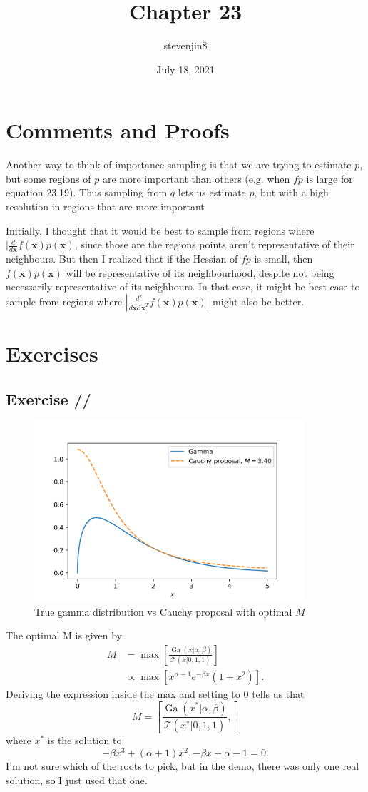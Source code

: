 \documentclass[a4paper,11pt]{article}
\title{Chapter 23}
\author{stevenjin8}
\date{July 18, 2021}
\DeclareMathOperator*{\Ga}{Ga}
\newcounter{exercise}
\newcounter{subexercise}
\newcommand*{\exercise}[1][]{
  \subsection*{Exercise
    \ifx/#1/\stepcounter{exercise}\arabic{exercise}
    \else#1\fi
  }
  \setcounter{subexercise}{0}
}
\begin{document}
	\maketitle

	\section*{Comments and Proofs}
	Another way to think of importance sampling is that we are trying to estimate $p$, but some
	regions of $p$ are more important than others (e.g. when $f \dot p$ is large for equation 23.19).
	Thus sampling from $q$ lets us estimate $p$, but with a high resolution in regions that are more
	important

	Initially, I thought that it would be best to sample from
	regions where $\lvert \frac{ d }{ d \mathbf{x} } f( \mathbf{x} )p( \mathbf{x} )$, since those are the
	regions points aren't representative of their neighbours. But then I realized that if the Hessian
	of $f \dot p$ is small, then $f( \mathbf{x} )p( \mathbf{x} )$ will be representative of its
	neighbourhood, despite not being necessarily representative of its neighbours. In that case, it
	might be best case to sample from regions where
	$\left\lvert \frac{ d^2 }{ d \mathbf{x} \mathbf{dx}^T } f( \mathbf{x} )p( \mathbf{x} ) \right\rvert$
	might also be better.

	\section*{Exercises}
	\setcounter{exercise}{1}
	\exercise
	\begin{figure}[t]
	\centering
	\includegraphics[width=10cm]{rejection-sampling.png}
	\caption{True gamma distribution vs Cauchy proposal with optimal $M$}
	\end{figure}

	The optimal M is given by
	\begin{align*}
		M &= \max \left[
			\frac{ \Ga( x | \alpha, \beta )}{ \mathcal{T}( x | 0, 1, 1 )}
		\right] \\
		&\propto \max\left[
			x ^ { \alpha - 1 } e ^ { -\beta x } \left( 1 + x^2 \right)
		\right].
	\end{align*}
	Deriving the expression inside the max and setting to 0 tells us that
	\[
		M = \left[
			\frac{ \Ga( x^* | \alpha, \beta )}{ \mathcal{T}( x^* | 0, 1, 1 )},
		\right]
	\]
	where $x^*$ is the solution to
	\[
		-\beta x^3 + ( \alpha + 1 ) x^2, -\beta x + \alpha - 1 = 0.
	\]
	I'm not sure which of the roots to pick, but in the demo, there was only one real solution, so I
	just used that one.
\end{document}
